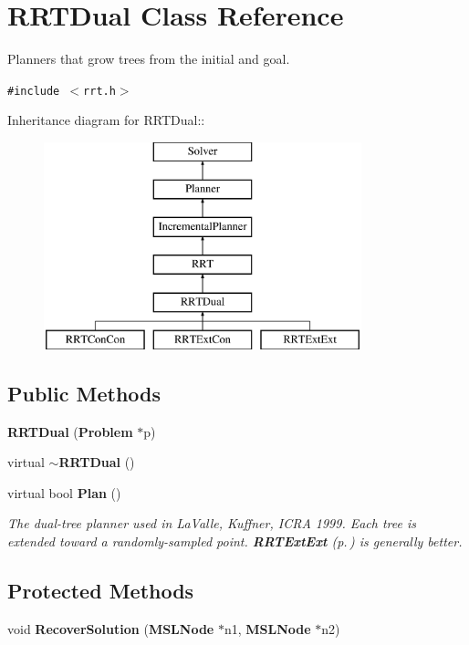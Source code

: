 \section{RRTDual  Class Reference}
\label{class_RRTDual}
Planners that grow trees from the initial and goal. 


{\tt \#include $<$rrt.h$>$}

Inheritance diagram for RRTDual::\begin{figure}[H]
\begin{center}
\leavevmode
\includegraphics[height=6cm]{class_RRTDual}
\end{center}
\end{figure}
\subsection*{Public Methods}
\begin{CompactItemize}
\item 
{\bf RRTDual} ({\bf Problem} $\ast$p)
\item 
virtual {\bf $\sim$RRTDual} ()
\item 
virtual bool {\bf Plan} ()
\begin{CompactList}\small\item\em The dual-tree planner used in La\-Valle, Kuffner, ICRA 1999. Each tree is extended toward a randomly-sampled point. {\bf RRTExt\-Ext} {\rm (p.\,\pageref{class_RRTExtExt})} is generally better.\item\end{CompactList}\end{CompactItemize}
\subsection*{Protected Methods}
\begin{CompactItemize}
\item 
void {\bf Recover\-Solution} ({\bf MSLNode} $\ast$n1, {\bf MSLNode} $\ast$n2)
\end{CompactItemize}


